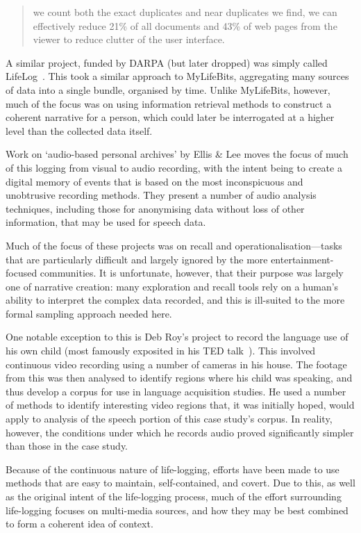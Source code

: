 \begin{quote}
we count both the exact duplicates and near duplicates we find, we can effectively reduce 21\% of all documents and 43\% of web pages from the viewer to reduce clutter of the user interface.
\end{quote}

A similar project, funded by DARPA (but later dropped) was simply called LifeLog~\cite{allen2008dredging}.  This took a similar approach to MyLifeBits, aggregating many sources of data into a single bundle, organised by time.  Unlike MyLifeBits, however, much of the focus was on using information retrieval methods to construct a coherent narrative for a person, which could later be interrogated at a higher level than the collected data itself.

Work on `audio-based personal archives' by Ellis \& Lee\cite{ellis2004audiolog} moves the focus of much of this logging from visual to audio recording, with the intent being to create a digital memory of events that is based on the most inconspicuous and unobtrusive recording methods.  They present a number of audio analysis techniques, including those for anonymising data without loss of other information, that may be used for speech data.

Much of the focus of these projects was on recall and operationalisation---tasks that are particularly difficult and largely ignored by the more entertainment-focused communities.  It is unfortunate, however, that their purpose was largely one of narrative creation: many exploration and recall tools rely on a human's ability to interpret the complex data recorded, and this is ill-suited to the more formal sampling approach needed here.

One notable exception to this is Deb Roy's project to record the language use of his own child (most famously exposited in his TED talk~\cite{roy2011ted}).  This involved continuous video recording using a number of cameras in his house.  The footage from this was then analysed to identify regions where his child was speaking, and thus develop a corpus for use in language acquisition studies.  He used a number of methods to identify interesting video regions that, it was initially hoped, would apply to analysis of the speech portion of this case study's corpus.  In reality, however, the conditions under which he records audio proved significantly simpler than those in the case study.



Because of the continuous nature of life-logging, efforts have been made to use methods that are easy to maintain, self-contained, and covert.  Due to this, as well as the original intent of the life-logging process, much of the effort surrounding life-logging focuses on multi-media sources, and how they may be best combined to form a coherent idea of context.  

